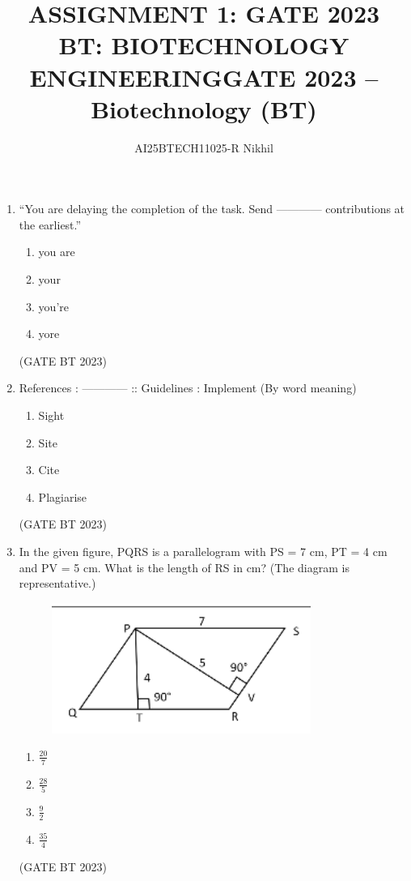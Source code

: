 \documentclass[journal,12pt,onecolumn]{IEEEtran}
\begin{document}
\title{
ASSIGNMENT 1: GATE 2023 \\
BT: BIOTECHNOLOGY ENGINEERING}
\author{AI25BTECH11025-R Nikhil}
\maketitle
\renewcommand{\thefigure}{\theenumi}
\renewcommand{\thetable}{\theenumi}


\title{GATE 2023 -- Biotechnology (BT)}
\date{}
\maketitle



\begin{enumerate}
    \item “You are delaying the completion of the task. Send ------------ contributions at the earliest.”
    \begin{enumerate}
        \item you are
        \item your
        \item you’re
        \item yore
    \end{enumerate}
    \hfill(GATE BT 2023)

    \item References : ------------ :: Guidelines : Implement (By word meaning)
    \begin{enumerate}
        \item Sight
        \item Site
        \item Cite
        \item Plagiarise
    \end{enumerate}
    \hfill(GATE BT 2023)

    \item In the given figure, PQRS is a parallelogram with PS = 7 cm, PT = 4 cm and PV = 5 cm. What is the length of RS in cm? (The diagram is representative.)
    \begin{figure}[H]
        \centering
        \includegraphics[width=0.8\textwidth]{Fig 1.png}
        \caption{}
        \label{fig:question3}
    \end{figure}
    \begin{enumerate}
        \item $\frac{20}{7}$
        \item $\frac{28}{5}$
        \item $\frac{9}{2}$
        \item $\frac{35}{4}$
    \end{enumerate}
    \hfill(GATE BT 2023)


\end{enumerate}
\end{document}
